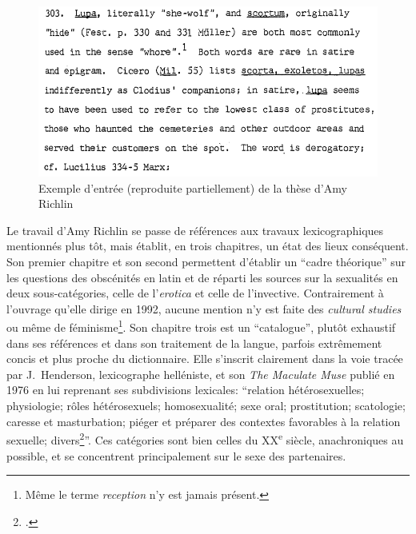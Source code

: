 \begin{figure}
    \centering
    \includegraphics[width=.7\linewidth]{figures/chap1/part3/303_AmyRichlin.png}
    \caption{Exemple d'entrée (reproduite partiellement) de la thèse d'Amy Richlin}
    \label{fig:chap1:entry_richlin}
\end{figure}

Le travail d'Amy Richlin se passe de références aux travaux lexicographiques mentionnés plus tôt, mais établit, en trois chapitres, un état des lieux conséquent. Son premier chapitre et son second permettent d'établir un \enquote{cadre théorique} sur les questions des obscénités en latin et de réparti les sources sur la sexualités en deux sous-catégories, celle de l'\textit{erotica} et celle de l'invective. Contrairement à l'ouvrage qu'elle dirige en 1992, aucune mention n'y est faite des \textit{cultural studies} ou même de féminisme\footnote{Même le terme \textit{reception} n'y est jamais présent.}. Son chapitre trois est un \enquote{catalogue}, plutôt exhaustif dans ses références et dans son traitement de la langue, parfois extrêmement concis et plus proche du dictionnaire. Elle s'inscrit clairement dans la voie tracée par J.~Henderson, lexicographe helléniste, et son \textit{The Maculate Muse} publié en 1976 en lui reprenant ses subdivisions lexicales: \enquote{relation hétérosexuelles; physiologie; rôles hétérosexuels; homosexualité; sexe oral; prostitution; scatologie; caresse et masturbation; piéger et préparer des contextes favorables à la relation sexuelle; divers\footcite[\textit{Abstract}, p.~II]{richlin_sexual_1978}}. Ces catégories sont bien celles du XX\textsuperscript{e} siècle, anachroniques au possible, et se concentrent principalement sur le sexe des partenaires.

